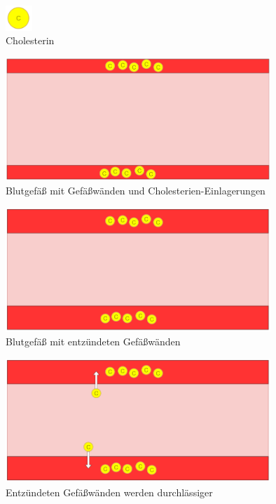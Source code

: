 \documentclass[xcolor=dvipsnames]{beamer}
\begin{document}
\begin{frame}[allowframebreaks]
        \begin{figure}
            \centering
            \includegraphics[width=1cm]{../images/cholesterin.png}
            \caption{Cholesterin}
        \end{figure}

        \framebreak

        \begin{figure}
            \centering
            \includegraphics[width=10cm]{../images/ader.png}
            \caption{Blutgefäß mit Gefäßwänden und Cholesterien-Einlagerungen}
        \end{figure}

        \framebreak

        \begin{figure}
            \centering
            \includegraphics[width=10cm]{../images/ader_2.png}
            \caption{Blutgefäß mit entzündeten Gefäßwänden}
        \end{figure}

        \framebreak

        \begin{figure}
            \centering
            \includegraphics[width=10cm]{../images/ader_3.png}
            \caption{Entzündeten Gefäßwänden werden durchlässiger}
        \end{figure}


\end{frame}
\end{document}
